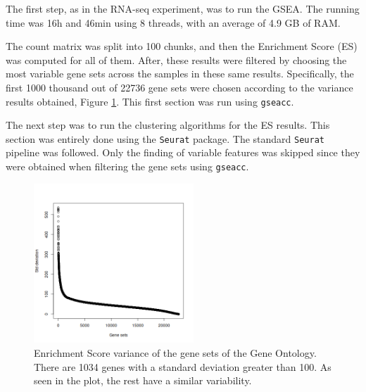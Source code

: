 \documentclass[aps,prb,twocolumn,superscriptaddress,floatfix,longbibliography]{revtex4-2}
\newif\ifptitle
\newif\ifpnumber
\newcounter{para}
\newcommand\ptitle[1]{\par\refstepcounter{para}
{\ifpnumber{\noindent\textcolor{lightgray}{\textbf{\thepara}}\indent}\fi}
{\ifptitle{\textbf{[{#1}]}}\fi}}
\begin{document}
\vspace{2mm}

\ptitle{Steps} The first step, as in the RNA-seq experiment, was to run the GSEA. The running time was 16h and 46min using 8 threads, with an average of 4.9 GB of RAM.

The count matrix was split into 100 chunks, and then the Enrichment Score (ES) was computed for all of them. After, these results were filtered by choosing the most variable gene sets across the samples in these same results. Specifically, the first 1000 thousand out of 22736 gene sets were chosen according to the variance results obtained, Figure \ref{fig:scrna-es-stddev}. This first section was run using \texttt{gseacc}.

The next step was to run the clustering algorithms for the ES results. This section was entirely done using the \texttt{Seurat} package. The standard \texttt{Seurat} pipeline was followed. Only the finding of variable features was skipped since they were obtained when filtering the gene sets using \texttt{gseacc}.

\begin{figure}[h]
\centering
\includegraphics[clip=true,width=6cm]{img/healthy-GO-ES-stddev.png}
\caption{Enrichment Score variance of the gene sets of the Gene Ontology. There are 1034 genes with a standard deviation greater than 100. As seen in the plot, the rest have a similar variability.}
\label{fig:scrna-es-stddev}
\end{figure}
\end{document}
